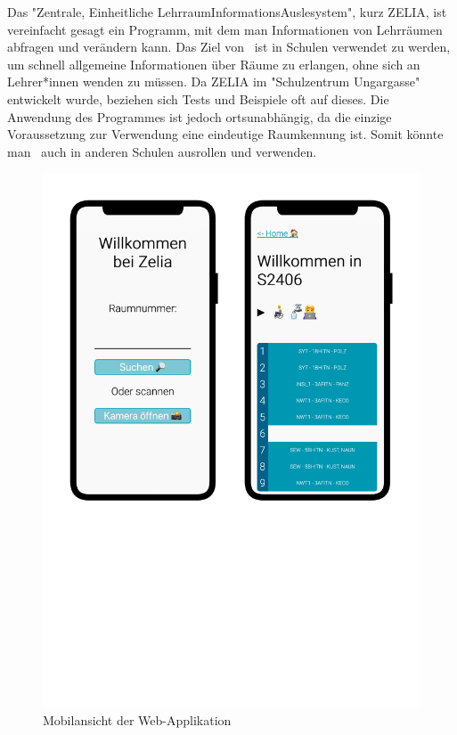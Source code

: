 

Das "Zentrale, Einheitliche LehrraumInformationsAuslesystem", kurz ZELIA, ist vereinfacht gesagt ein Programm, mit dem man Informationen von Lehrräumen abfragen und verändern kann. Das Ziel von \ZELIA\ ist in Schulen verwendet zu werden, um schnell allgemeine Informationen über Räume zu erlangen, ohne sich an Lehrer*innen wenden zu müssen. Da \mbox{ZELIA} im "Schulzentrum Ungargasse" entwickelt wurde, beziehen sich Tests und Beispiele oft auf dieses. Die Anwendung des Programmes ist jedoch ortsunabhängig, da die einzige Voraussetzung zur Verwendung eine eindeutige Raumkennung ist. Somit könnte man \ZELIA\ auch in anderen Schulen ausrollen und verwenden. 

\begin{figure}[H]
    \centering
    \includegraphics[width=120mm]{media/Intro/frontend_mobile.svg.pdf}
    \caption{Mobilansicht der Web-Applikation}
\end{figure}

